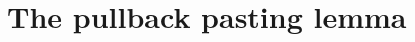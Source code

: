 \begin{comment}
\begin{defn}
A \define{commuting square} consists of
\begin{enumerate}
\item types $A$, $B$, $X$, $Y$,
\item maps $f:A\to X$, $g:B\to Y$, $i:A\to B$, and $j:X\to Y$
\item a homotopy $H:j\circ f\htpy g\circ i$. 
\end{enumerate}
\end{defn}

\begin{defn}
Consider a diagram of the form
\begin{equation*}
\begin{tikzcd}
A \arrow[d,swap,"f"] & B \arrow[d,"g"] \\
X \arrow[r,swap,"h"] & Y
\end{tikzcd}
\end{equation*}
We will construct an equivalence between the type
\begin{equation*}
\prd{x:X}\fib{f}{x}\to\fib{g}{h(x)}
\end{equation*}
of fiberwise transformations between the fibers of $f$ and $g$, and the type
\begin{equation*}
\sm{i:A\to B} h\circ f\htpy g\circ i.
\end{equation*}
\end{defn}

Now consider additionally $i:A\to B$ and $H:h\circ f\htpy g\circ i$, and let $u:A\to X\times_Y B$ be the unique map for which the diagram
\begin{equation*}
\begin{tikzcd}
A \arrow[ddr,bend right=15,swap,"f"] \arrow[dr,densely dotted,"u"] \arrow[drr,bend left=15,"i"] \\
& X\times_Y B \arrow[d,swap,"\pi_1"] \arrow[r,"\pi_2" near start] & B \arrow[d,"g"] \\
& X \arrow[r,swap,"h"] & Y
\end{tikzcd}
\end{equation*}
commutes. Show that the fiber of $u$ at $(x,b,p):X\times_Y B$ is equivalent to the fiber of
\begin{equation*}
i_x:\fib{f}{x} \to \fib{g}{h(x)}
\end{equation*}
at $(b,p^{-1})$.
\end{comment}

\section{The pullback pasting lemma}


